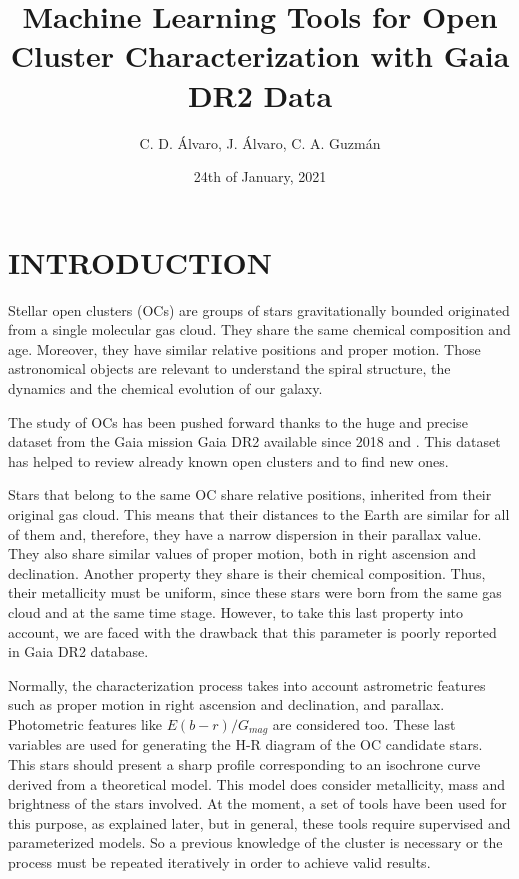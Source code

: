 \documentclass[11pt,a4paper,USenglish,twocolumn]{article}
\title{Machine Learning Tools for Open Cluster Characterization with Gaia DR2 Data}
\author{C. D. Álvaro, J. Álvaro, C. A. Guzmán}
\date{24th of January, 2021}
\begin{document}
\twocolumn[
\begin{@twocolumnfalse}
\maketitle
\end{@twocolumnfalse}
]




\section{INTRODUCTION}

Stellar open clusters (OCs) \cite{janes1982open} are groups of stars
gravitationally bounded originated from a single molecular gas cloud.
They share the same chemical composition and age. Moreover,
they have similar relative positions and proper motion.
Those astronomical objects are relevant to understand the spiral structure,
the dynamics and the chemical evolution of our galaxy.

The study of OCs has been pushed forward thanks to the huge and precise dataset
from the Gaia mission Gaia DR2 available since 2018
\cite{collaboration2016description} and \cite{gaia2018gaia}.
This dataset has helped to review already known open clusters and to find new ones.

Stars that belong to the same OC share relative positions,
inherited from their original gas cloud.
This means that their distances to the Earth are similar for all of them and,
therefore, they have a narrow dispersion in their parallax value.
They also share similar values of proper motion, both in right ascension and declination.
Another property they share is their chemical composition.
Thus, their metallicity must be uniform,
since these stars were born from the same gas cloud and at the same time stage.
However, to take this last property into account, we are faced with the drawback
that this parameter is poorly reported in Gaia DR2 database.

Normally, the characterization process takes into account astrometric features
such as proper motion in right ascension and declination, and parallax.
Photometric features like $E(b-r) / G_{mag}$ are considered too.
These last variables are used for generating the H-R diagram of the OC candidate stars.
This stars should present a sharp profile corresponding to an isochrone curve derived
from a theoretical model.
This model does consider metallicity, mass and brightness of the stars involved.
At the moment, a set of tools have been used for this purpose, as explained later,
but in general, these tools require supervised and parameterized models.
So a previous knowledge of the cluster is necessary or the process must be repeated
iteratively in order to achieve valid results.
\end{document}
